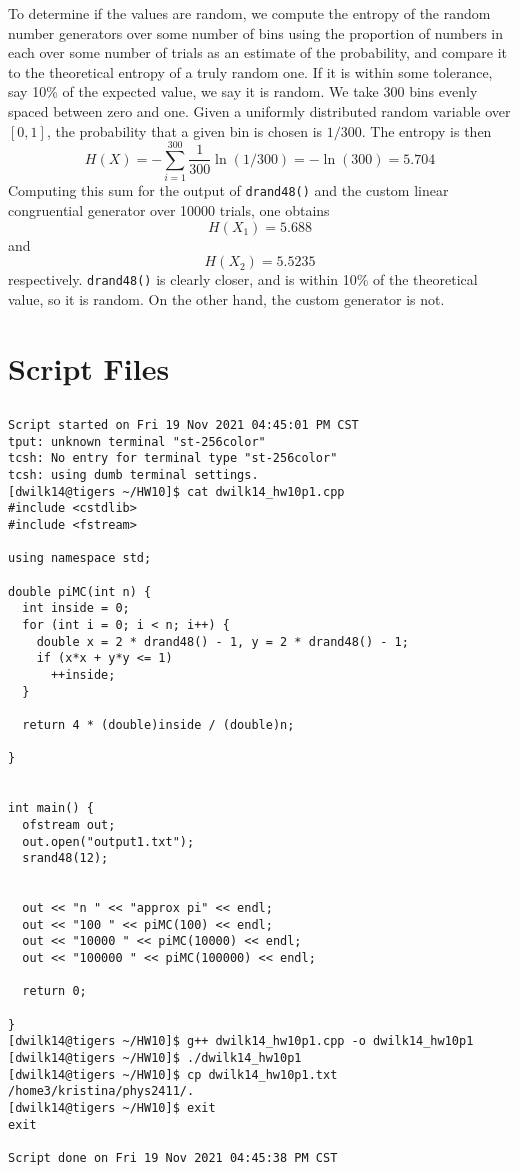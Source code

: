 \documentclass{article}
\begin{document}
To determine if the values are random, we compute the entropy of the random number generators over some number of bins using the proportion of numbers in each over some number of trials as an estimate of the probability, and compare it to the theoretical entropy of a truly random one. If it is within some tolerance, say 10\% of the expected value, we say it is random.
We take 300 bins evenly spaced between zero and one. Given a uniformly distributed random variable over $[0,1]$, the probability that a given bin is chosen is $1/300$. The entropy is then
\[H(X)=-\sum_{i=1}^{300}\frac{1}{300}\ln(1/300)=-\ln(300)=5.704\]
Computing this sum for the output of \verb|drand48()| and the custom linear congruential generator over 10000 trials, one obtains
\[H(X_1)=5.688\]
and
\[H(X_2)=5.5235\]
respectively. \verb|drand48()| is clearly closer, and is within 10\% of the theoretical value, so it is random. On the other hand, the custom generator is not.

\section{Script Files}
\subsection{}
\begin{verbatim}
Script started on Fri 19 Nov 2021 04:45:01 PM CST
tput: unknown terminal "st-256color"
tcsh: No entry for terminal type "st-256color"
tcsh: using dumb terminal settings.
[dwilk14@tigers ~/HW10]$ cat dwilk14_hw10p1.cpp
#include <cstdlib>
#include <fstream>

using namespace std;

double piMC(int n) {
  int inside = 0;
  for (int i = 0; i < n; i++) {
    double x = 2 * drand48() - 1, y = 2 * drand48() - 1;
    if (x*x + y*y <= 1)
      ++inside;
  }

  return 4 * (double)inside / (double)n;

}


int main() {
  ofstream out;
  out.open("output1.txt");
  srand48(12);


  out << "n " << "approx pi" << endl;
  out << "100 " << piMC(100) << endl;
  out << "10000 " << piMC(10000) << endl;
  out << "100000 " << piMC(100000) << endl;

  return 0;

}
[dwilk14@tigers ~/HW10]$ g++ dwilk14_hw10p1.cpp -o dwilk14_hw10p1
[dwilk14@tigers ~/HW10]$ ./dwilk14_hw10p1
[dwilk14@tigers ~/HW10]$ cp dwilk14_hw10p1.txt /home3/kristina/phys2411/.
[dwilk14@tigers ~/HW10]$ exit
exit

Script done on Fri 19 Nov 2021 04:45:38 PM CST
\end{verbatim}
\end{document}
